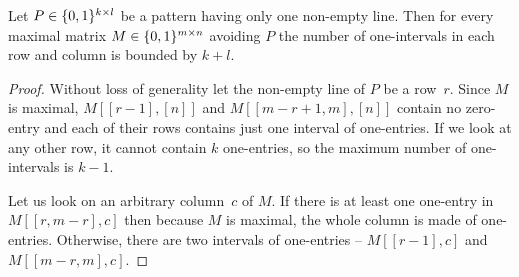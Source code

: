 \begin{lemma}
Let $P\in\{0,1\}^{k\times l}$ be a pattern having only one non-empty line. Then for every maximal matrix $M\in\{0,1\}^{m\times n}$ avoiding $P$ the number of one-intervals in each row and column is bounded by $k+l$. 
\end{lemma}
\begin{proof}
Without loss of generality let the non-empty line of $P$ be a row~$r$. Since $M$ is maximal, $M[[r-1],[n]]$ and $M[[m-r+1,m],[n]]$ contain no zero-entry and each of their rows contains just one interval of one-entries. If we look at any other row, it cannot contain $k$ one-entries, so the maximum number of one-intervals is $k-1$.

Let us look on an arbitrary column~$c$ of $M$. If there is at least one one-entry in $M[[r,m-r],c]$ then because $M$ is maximal, the whole column is made of one-entries. Otherwise, there are two intervals of one-entries -- $M[[r-1],c]$ and $M[[m-r,m],c]$.
\end{proof}

